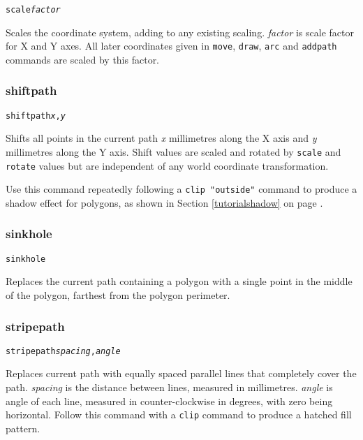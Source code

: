 \begin{alltt}
scale \textit{factor}
\end{alltt}

Scales the coordinate system, adding to any existing scaling.  \textit{factor}
is scale factor for X and Y axes.  All later coordinates given in
\texttt{move}, \texttt{draw}, \texttt{arc} and \texttt{addpath} commands are
scaled by this factor.

\subsubsection{shiftpath}

\begin{alltt}
shiftpath \textit{x}, \textit{y}
\end{alltt}

Shifts all points in the current path \textit{x} millimetres along the X axis
and \textit{y} millimetres along the Y axis.  Shift values are scaled and
rotated by \texttt{scale} and \texttt{rotate} values but are independent
of any world coordinate transformation.

Use this command
repeatedly following a \texttt{clip "outside"} command to produce a shadow
effect for polygons, as shown in 
Section \ref{tutorialshadow} on page \pageref{tutorialshadow}.

\subsubsection{sinkhole}

\begin{alltt}
sinkhole
\end{alltt}

Replaces the current path containing a polygon with a single point in the
middle of the polygon, farthest from the polygon perimeter.

\subsubsection{stripepath}

\begin{alltt}
stripepath \textit{spacing}, \textit{angle}
\end{alltt}

Replaces current path with equally spaced parallel lines that completely cover
the path.  \textit{spacing} is the distance between lines, measured in
millimetres.  \textit{angle} is angle of each line, measured in
counter-clockwise in degrees, with zero being horizontal.  Follow this command
with a \texttt{clip} command to produce a hatched fill pattern.


